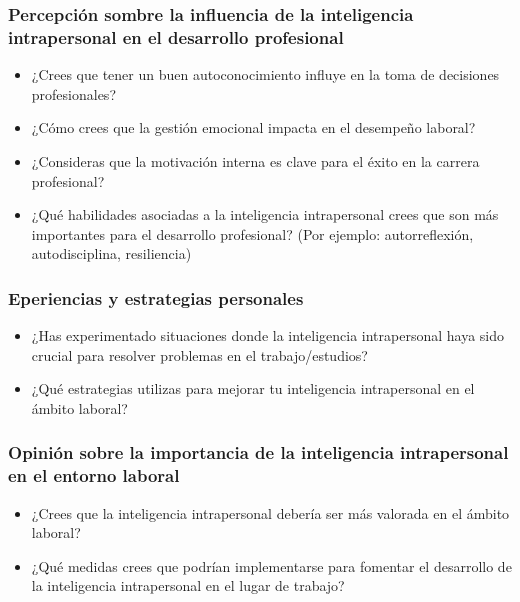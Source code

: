 \subsubsection{Percepci\'on sombre la influencia de la inteligencia
intrapersonal en el desarrollo profesional}
\begin{itemize}
\item ¿Crees que tener un buen autoconocimiento influye en la toma de decisiones profesionales?
\item ¿Cómo crees que la gestión emocional impacta en el desempeño laboral?
\item ¿Consideras que la motivación interna es clave para el éxito en la carrera profesional?
\item ¿Qué habilidades asociadas a la inteligencia intrapersonal crees que son más importantes para el desarrollo profesional? (Por ejemplo: autorreflexión, autodisciplina, resiliencia)
\end{itemize}
\subsubsection{Eperiencias y estrategias personales}
\begin{itemize}
\item ¿Has experimentado situaciones donde la inteligencia intrapersonal haya sido crucial para resolver problemas en el trabajo/estudios?
\item ¿Qué estrategias utilizas para mejorar tu inteligencia intrapersonal en el ámbito laboral?
\end{itemize}
\subsubsection{Opini\'on sobre la importancia de la inteligencia intrapersonal
en el entorno laboral}
\begin{itemize}
\item ¿Crees que la inteligencia intrapersonal debería ser más valorada en el ámbito laboral? 
\item ¿Qué medidas crees que podrían implementarse para fomentar el desarrollo de la inteligencia intrapersonal en el lugar de trabajo?
\end{itemize}
